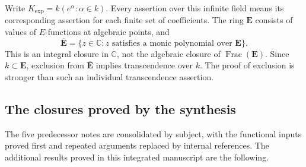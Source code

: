 \documentclass[11pt]{article}
\theoremstyle{definition}
\theoremstyle{remark}
\newcommand{\E}{\mathbf E}
\newcommand{\Ebar}{\overline{\mathbf E}}
\newcommand{\Kexp}{K_{\mathrm{exp}}}
\begin{document}
Write $\Kexp=k(e^\alpha:\alpha\in k)$. Every assertion over this
infinite field means its corresponding assertion for each finite set of
coefficients. The ring $\E$ consists of values of $E$-functions at algebraic
points, and
\[
 \Ebar=\{z\in\mathbb C:z\text{ satisfies a monic polynomial over }\E\}.
\]
This is an integral closure in $\mathbb C$, not the algebraic closure
of $\operatorname{Frac}(\E)$. Since $k\subset\E$, exclusion from
$\Ebar$ implies transcendence over $k$. The proof of exclusion is
stronger than such an individual transcendence assertion.

\subsection{The closures proved by the synthesis}
The five predecessor notes are consolidated by subject, with the
functional inputs proved first and repeated arguments replaced by internal
references. The additional results proved in this integrated manuscript
are the following.
\end{document}
